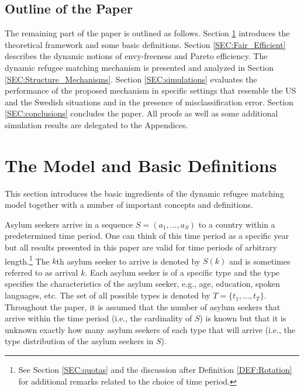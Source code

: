 \documentclass[12pt,fleqn]{article}
\begin{document}
\subsection{Outline of the Paper}
The remaining part of the paper is outlined as follows. Section \ref{SEC:Model} introduces the theoretical framework and some basic definitions. Section \ref{SEC:Fair_Efficient} describes the dynamic notions of envy-freeness and Pareto efficiency. The dynamic refugee matching mechanism is presented and analyzed in Section \ref{SEC:Structure_Mechanisms}. Section \ref{SEC:simulations} evaluates the performance of the proposed mechanism in specific settings that resemble the US and the Swedish situations and in the presence of misclassification error. Section \ref{SEC:conclusions} concludes the paper. All proofs as well as some additional simulation results are delegated to the Appendices.

\section{The Model and Basic Definitions}\label{SEC:Model}
This section introduces the basic ingredients of the dynamic refugee matching model together with a number of important concepts and definitions.

Asylum seekers arrive in a sequence $S=(a_1,\ldots,a_S)$ to a country within a predetermined time period. One can think of this time period as a specific year but all results presented in this paper are valid for time periods of arbitrary length.\footnote{See Section \ref{SEC:quotas} and the discussion after Definition \ref{DEF:Rotation} for additional remarks related to the choice of time period.} The $k$th asylum seeker to arrive is denoted by $S(k)$ and is sometimes referred to as arrival $k$. Each asylum seeker is of a specific type and the type specifies the characteristics of the asylum seeker, e.g., age, education, spoken languages, etc. The set of all possible types is denoted by $T=\{t_1,\ldots,t_T\}$. Throughout the paper, it is assumed that the number of asylum seekers that arrive within the time period (i.e., the cardinality of $S$) is known but that it is unknown exactly how many asylum seekers of each type that will arrive (i.e., the type distribution of the asylum seekers in $S$).
\end{document}
